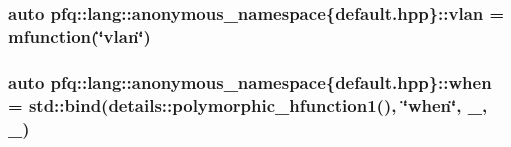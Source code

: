 \hypertarget{namespacepfq_1_1lang_1_1anonymous__namespace_02default_8hpp_03_a747e907a678ad69c5bfdd3048a239b6a}{
\subsubsection[{vlan}]{\setlength{\rightskip}{0pt plus 5cm}auto pfq\+::lang\+::anonymous\+\_\+namespace\{default.\+hpp\}\+::vlan = {\bf mfunction}(\char`\"{}vlan\char`\"{})}}\label{namespacepfq_1_1lang_1_1anonymous__namespace_02default_8hpp_03_a747e907a678ad69c5bfdd3048a239b6a}
\hypertarget{namespacepfq_1_1lang_1_1anonymous__namespace_02default_8hpp_03_a22ae8d6c01ae06cdfa698cf9198d292b}{
\subsubsection[{when}]{\setlength{\rightskip}{0pt plus 5cm}auto pfq\+::lang\+::anonymous\+\_\+namespace\{default.\+hpp\}\+::when = std\+::bind(details\+::polymorphic\+\_\+hfunction1(), \char`\"{}when\char`\"{}, \+\_, \+\_)}}\label{namespacepfq_1_1lang_1_1anonymous__namespace_02default_8hpp_03_a22ae8d6c01ae06cdfa698cf9198d292b}
